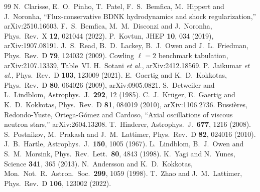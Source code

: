 \documentclass[aps,prd,preprint,amsmath,amssymb,nofootinbib,longbibliography]{revtex4-2}
\begin{document}
\begin{thebibliography}{99}
 N.~Clarisse, E.~O.~Pinho, T.~Patel, F.~S.~Bemfica, M.~Hippert and
J.~Noronha, ``Flux-conservative BDNK hydrodynamics and shock regularization,'' arXiv:2510.16603.
 F.~S.~Bemfica, M.~M.~Disconzi and J.~Noronha, Phys.\ Rev.\ X \textbf{12},
021044 (2022).
 P.~Kovtun, JHEP \textbf{10}, 034 (2019), arXiv:1907.08191.
 J.~S.~Read, B.~D.~Lackey, B.~J.~Owen and J.~L.~Friedman, Phys.\ Rev.\ D
\textbf{79}, 124032 (2009).
 Cowling $\ell=2$ benchmark tabulation, arXiv:2107.13339, Table~VI.
 H.~Sotani \emph{et al.}, arXiv:2412.18569.
 P.~Jaikumar \emph{et al.}, Phys.\ Rev.\ D \textbf{103}, 123009 (2021).
 E.~Gaertig and K.~D.~Kokkotas, Phys.\ Rev.\ D \textbf{80}, 064026
(2009), arXiv:0905.0821.
 S.~Detweiler and L.~Lindblom, Astrophys.\ J.\ \textbf{292}, 12
(1985).
 C.~J.~Kr\"uger, E.~Gaertig and K.~D.~Kokkotas, Phys.\ Rev.\ D \textbf{81},
084019 (2010), arXiv:1106.2736.
 Bussi\`eres, Redondo-Yuste, Ortega-G\'omez and Cardoso, ``Axial
oscillations of viscous neutron stars,'' arXiv:2604.13208.
 T.~Hinderer, Astrophys.\ J.\ \textbf{677}, 1216 (2008).
 S.~Postnikov, M.~Prakash and J.~M.~Lattimer, Phys.\ Rev.\ D \textbf{82},
024016 (2010).
 J.~B.~Hartle, Astrophys.\ J.\ \textbf{150}, 1005 (1967).
 L.~Lindblom, B.~J.~Owen and S.~M.~Morsink, Phys.\ Rev.\ Lett.\ \textbf{80},
4843 (1998).
 K.~Yagi and N.~Yunes, Science \textbf{341}, 365 (2013).
 N.~Andersson and K.~D.~Kokkotas, Mon.\ Not.\ R.\ Astron.\ Soc.\ \textbf{299}, 1059
(1998).
 T.~Zhao and J.~M.~Lattimer, Phys.\ Rev.\ D \textbf{106}, 123002 (2022).
\end{thebibliography}
\end{document}
